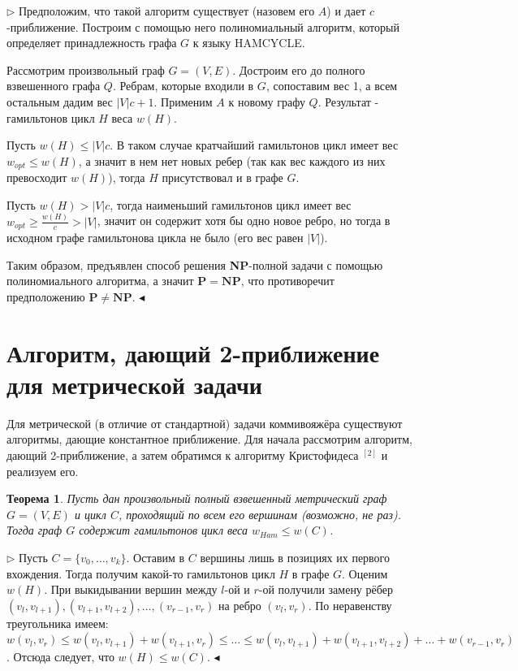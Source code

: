 \documentclass[14pt]{article}
\newtheorem{Th}{Теорема}
\newenvironment{PROOF}
{\par\noindent{\bf Доказательство:}\newline$\triangleright$}
{\hfill$\scriptstyle\blacktriangleleft$}
\begin{document}
	\begin{PROOF}
	Предположим, что такой алгоритм существует (назовем его $A$) и дает $c$-приближение. Построим с помощью него полиномиальный алгоритм, который определяет принадлежность графа $G$ к языку HAMCYCLE.
	
	Рассмотрим произвольный граф $G = (V, E)$. Достроим его до полного взвешенного графа $Q$. Ребрам, которые входили в $G$, сопоставим вес 1, а всем остальным дадим вес $|V|c + 1$. Применим $A$ к новому графу $Q$. Результат - гамильтонов цикл $H$ веса $w(H)$.
	
	Пусть $w(H) \leq |V|c$. В таком случае кратчайший гамильтонов цикл имеет вес $w_{opt} \leq w(H)$, а значит в нем нет новых ребер (так как вес каждого из них превосходит $w(H)$), тогда $H$ присутствовал и в графе $G$.
	
	Пусть $w(H) > |V|c$, тогда наименьший гамильтонов цикл имеет вес $w_{opt} \geq \frac{w(H)}{c} > |V|$, значит он содержит хотя бы одно новое ребро, но тогда в исходном графе гамильтонова цикла не было (его вес равен $|V|$).
	
	Таким образом, предъявлен способ решения \textbf{NP}-полной задачи с помощью полиномиального алгоритма, а значит $\mathbf{P} = \mathbf{NP}$, что противоречит предположению $\mathbf{P} \ne \mathbf{NP}$.	
	\end{PROOF}

	
	\section{Алгоритм, дающий 2-приближение для метрической задачи}
	
	Для метрической (в отличие от стандартной) задачи коммивояжёра существуют алгоритмы, дающие константное приближение. Для начала рассмотрим алгоритм, дающий 2-приближение, а затем обратимся к алгоритму Кристофидеса \hyperref[algoChrist]{$^{[2]}$} и реализуем его.
	
	\begin{Th}\label{Th2}
		Пусть дан произвольный полный взвешенный метрический граф $G = (V,E)$ и цикл $C$, проходящий по всем его вершинам (возможно, не раз). Тогда граф $G$ содержит гамильтонов цикл веса $w_{Ham} \leq w(C)$.	
	\end{Th}
	
	\begin{PROOF}
		Пусть $C = \{v_0,\dots, v_k\}$. Оставим в $C$ вершины лишь в позициях их первого вхождения. Тогда получим какой-то гамильтонов цикл $H$ в графе $G$. Оценим $w(H)$. При выкидывании вершин между $l$-ой и $r$-ой получили замену рёбер $(v_l,v_{l+1}), (v_{l+1}, v_{l+2}), \dots, (v_{r-1}, v_r)$ на ребро $(v_l, v_r)$. По неравенству треугольника имеем: $w(v_l, v_r) \leq w(v_l, v_{l+1}) + w(v_{l+1}, v_r) \leq \dots \leq w(v_l, v_{l+1}) + w(v_{l+1}, v_{l+2}) + \dots + w(v_{r-1}, v_r)$. Отсюда следует, что $w(H) \leq w(C)$. 
	\end{PROOF}
	
\end{document}
